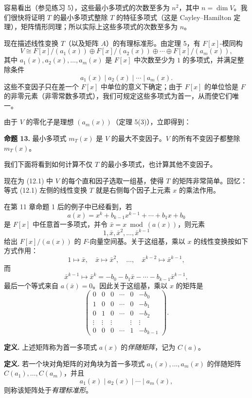 容易看出（参见练习 5），这些最小多项式的次数至多为 $n^2$，其中 $n=\dim V$。我们很快将证明 $T$ 的最小多项式整除 $T$ 的特征多项式（这是 Cayley--Hamilton 定理），矩阵情形同理；所以实际上这些多项式的次数至多为 $n$。

现在描述线性变换 $T$（以及矩阵 $A$）的有理标准形。由定理 5，有 $F[x]$-模同构
\[
V\cong F[x]/(a_1(x))\oplus F[x]/(a_2(x))\oplus\cdots\oplus F[x]/(a_m(x)),\tag{12.1}
\]
其中 $a_1(x),a_2(x),\ldots,a_m(x)$ 是 $F[x]$ 中次数至少为 $1$ 的多项式，并满足整除条件
\[
a_1(x)\mid a_2(x)\mid\cdots\mid a_m(x).
\]
这些不变因子只在差一个 $F[x]$ 中单位的意义下确定；由于 $F[x]$ 的单位恰是 $F$ 的非零元素（非零常数多项式），我们可规定这些多项式为首一，从而使它们唯一。

由于 $V$ 的零化子是理想 $(a_m(x))$（定理 5(3)），立即得到：

\noindent\textbf{命题 13.} 最小多项式 $m_T(x)$ 是 $V$ 的最大不变因子。$V$ 的所有不变因子都整除 $m_T(x)$。

我们下面将看到如何计算不仅 $T$ 的最小多项式，也计算其他不变因子。

现在为 (12.1) 中 $V$ 的每个直和因子选取一组基，使得 $T$ 的矩阵非常简单。回忆：等式 (12.1) 左侧的线性变换 $T$ 就是右侧每个因子上元素 $x$ 的乘法作用。

在第 11 章命题 1 后的例子中已经看到，若
\[
a(x)=x^k+b_{k-1}x^{k-1}+\cdots+b_1x+b_0
\]
是 $F[x]$ 中任意首一多项式，并令 $\bar x=x\bmod(a(x))$，则元素
\[
1,\bar x,\bar x^2,\ldots,\bar x^{k-1}
\]
给出 $F[x]/(a(x))$ 的 $F$-向量空间基。关于这组基，乘以 $x$ 的线性变换按如下方式作用：
\[
1\mapsto\bar x,
\quad \bar x\mapsto\bar x^2,
\quad\ldots,
\quad \bar x^{k-2}\mapsto\bar x^{k-1},
\]
而
\[
\bar x^{k-1}\mapsto \bar x^k=-b_0-b_1\bar x-\cdots-b_{k-1}\bar x^{k-1},
\]
最后一个等式来自 $a(\bar x)=0$。因此关于这组基，乘以 $x$ 的矩阵是
\[
\begin{pmatrix}
0&0&0&\cdots&0&-b_0\\
1&0&0&\cdots&0&-b_1\\
0&1&0&\cdots&0&-b_2\\
\vdots&\vdots&\vdots& &\vdots&\vdots\\
0&0&0&\cdots&1&-b_{k-1}
\end{pmatrix}.
\]

\noindent\textbf{定义.} 上述矩阵称为首一多项式 $a(x)$ 的\emph{伴随矩阵}，记为 $C(a)$。

\noindent\textbf{定义.} 若一个块对角矩阵的对角块为首一多项式 $a_1(x),\ldots,a_m(x)$ 的伴随矩阵 $C(a_1),\ldots,C(a_m)$，并且
\[
a_1(x)\mid a_2(x)\mid\cdots\mid a_m(x),
\]
则称该矩阵处于\emph{有理标准形}。

